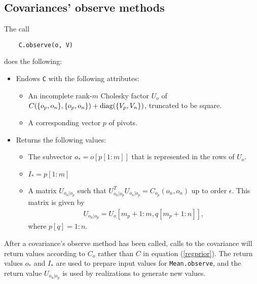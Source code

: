 \documentclass{report}
\begin{document}
\subsection{Covariances' observe methods}
The call
\begin{verbatim}
    C.observe(o, V)
\end{verbatim}
does the following:
\begin{itemize}
    \item Endows \texttt{C} with the following attributes:
    \begin{itemize}
        \item An incomplete rank-$m$ Cholesky factor $U_o$ of $C(\{o_p,o_n\},\{o_p,o_n\}) + \textup{diag}(\{V_p,V_n\})$, truncated to be square.
        \item A corresponding vector $p$ of pivots.
    \end{itemize}
    \item Returns the following values:
    \begin{itemize}
        \item The subvector $o_*=o[p[1:m]]$ that is represented in the rows of $U_o$.
        \item $I_*=p[1:m]$
        \item A matrix $U_{o_n|o_p}$ such that $U_{o_n|o_p}^TU_{o_n|o_p} = C_{o_p}(o_n,o_n)$ up to order $\epsilon$. This matrix is given by
        \begin{eqnarray*}
            U_{o_n|o_p} = U_o[m_p+1 : m,q[m_p+1: n]],
        \end{eqnarray*}
        where $p[q] = 1:n$.
    \end{itemize}
\end{itemize}

After a covariance's observe method has been called, calls to the covariance will return values according to $C_o$ rather than $C$ in equation (\ref{regprior}). The return values $o_*$ and $I_*$ are used to prepare input values for \texttt{Mean.observe}, and the return value $U_{o_n|o_p}$ is used by realizations to generate new values.
\end{document}
